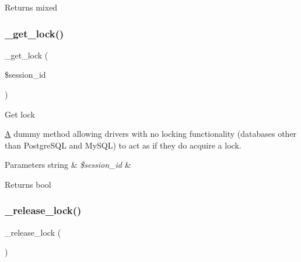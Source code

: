 \begin{DoxyReturn}{Returns}
mixed 
\end{DoxyReturn}
\mbox{\label{class_c_i___session__driver_a2c49c8e23be3e2aca96a9d20de18ffc2}} 
\subsubsection{\texorpdfstring{\+\_\+get\+\_\+lock()}{\_get\_lock()}}
{\footnotesize\ttfamily \+\_\+get\+\_\+lock (\begin{DoxyParamCaption}\item[{}]{\$session\+\_\+id }\end{DoxyParamCaption})\hspace{0.3cm}{\ttfamily [protected]}}

Get lock

\mbox{\hyperlink{class_a}{A}} dummy method allowing drivers with no locking functionality (databases other than Postgre\+S\+QL and My\+S\+QL) to act as if they do acquire a lock.


\begin{DoxyParams}[1]{Parameters}
string & {\em \$session\+\_\+id} & \\
\hline
\end{DoxyParams}
\begin{DoxyReturn}{Returns}
bool 
\end{DoxyReturn}
\mbox{\label{class_c_i___session__driver_a0265e356e6cf1eaba229663c1664c37d}} 
\subsubsection{\texorpdfstring{\+\_\+release\+\_\+lock()}{\_release\_lock()}}
{\footnotesize\ttfamily \+\_\+release\+\_\+lock (\begin{DoxyParamCaption}{ }\end{DoxyParamCaption})\hspace{0.3cm}{\ttfamily [protected]}}

